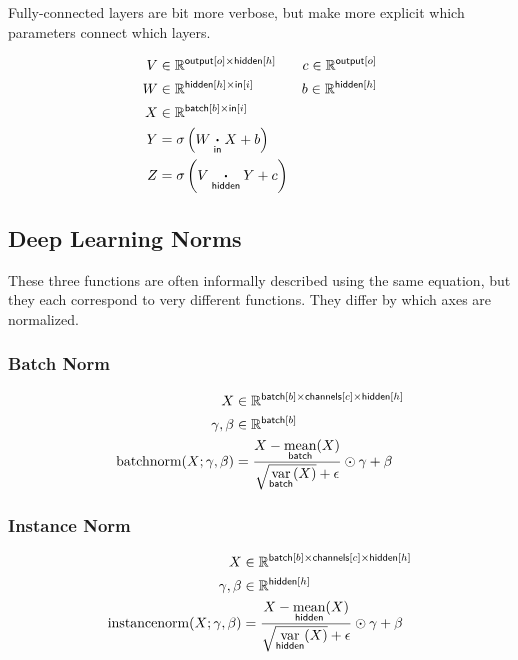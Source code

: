 \documentclass{article}
\newcommand{\reals}{\mathbb{R}}
\begin{document}
Fully-connected layers are bit more verbose, but make more explicit which parameters connect which layers.

\begin{align*} 
V &\in \reals^{\nset{output}{o} \times \nset{hidden}{h}} & c\in \reals^{\nset{output}{o}} \\
W &\in \reals^{{\nset{hidden}{h} \times \nset{in}{i}}} & b \in \reals^{\nset{hidden}{h}} \\
X &\in \reals^{{\nset{batch}{b} \times \nset{in}{i}}} \\
Y &= \sigma \left( W \ndot{in} X + b \right) \\
Z &= \sigma \left( V \ndot{hidden} Y + c \right)  
\end{align*}

\subsection{Deep Learning Norms}

These three functions are often informally described using the same
equation, but they each correspond to very different functions. They differ
by which axes are normalized.

\subsubsection*{Batch Norm}

\begin{align*} 
X &\in \reals^{{\nset{batch}{b} \times \nset{channels}{c} \times \nset{hidden}{h}}}\\
\gamma, \beta &\in \reals^{{\nset{batch}{b}}} \\
\text{batchnorm}(X; \gamma, \beta) &= \frac{X - \nfun{batch}{mean}(X)}{\sqrt{\nfun{batch}{var}(X)} + \epsilon} \odot \gamma + \beta
\end{align*}


\subsubsection*{Instance Norm}

\begin{align*} 
X &\in \reals^{{\nset{batch}{b} \times \nset{channels}{c} \times \nset{hidden}{h}}}\\
\gamma, \beta &\in \reals^{{\nset{hidden}{h}}} \\
\text{instancenorm}(X; \gamma, \beta) &= \frac{X - \nfun{hidden}{\text{mean}}(X)}{\sqrt{\nfun{hidden}{\text{var}}(X)} + \epsilon} \odot \gamma + \beta
\end{align*}
\end{document}
